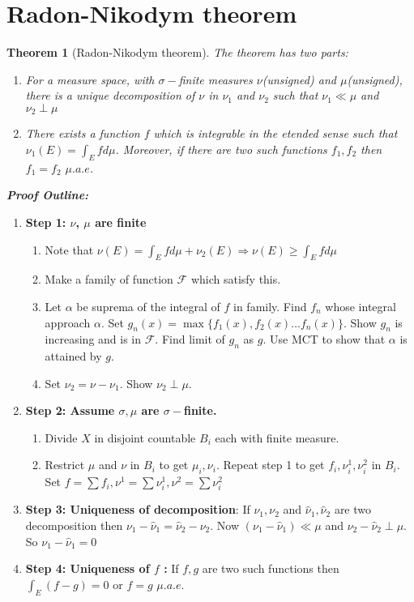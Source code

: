 \documentclass[notoc]{tufte-book}
\newtheorem{theorem}{Theorem}
\begin{document}
\section{Radon-Nikodym theorem}
\begin{theorem}[Radon-Nikodym theorem]
	The theorem has two parts:
	\begin{enumerate}
		\item For a measure space, with $\sigma-$finite measures $\nu$(unsigned) and $\mu$(unsigned), there is a unique decomposition of $\nu$ in $\nu_1$ and $\nu_2$ such that $\nu_1\ll\mu$ and $\nu_2\perp\mu$
		\item There exists a function $f$ which is integrable in the etended sense such that $\nu_1(E)=\int_Efd\mu$. Moreover, if there are two such functions $f_1,f_2$ then $f_1=f_2$ $\mu.a.e$. 
	\end{enumerate}
\end{theorem}
\textbf{\textit{Proof Outline:}}\\
\begin{enumerate}
	\item \textbf{Step 1: $\nu$, $\mu$ are finite}\\
		\begin{enumerate}
			\item Note that $\nu(E)=\int_Efd\mu+\nu_2(E)\Rightarrow \nu(E)\geq\int_Efd\mu$
			\item Make a family of function $\mathcal{F}$ which satisfy this. 
			\item Let $\alpha$ be suprema of the integral of $f$ in family. Find $f_n$ whose integral approach $\alpha$. Set $g_n(x)=\max\{f_1(x),f_2(x)\hdots f_n(x)\}$. Show $g_n$ is increasing and is in $\mathcal{ F}$. Find limit of $g_n$ as $g$. Use MCT to show that $\alpha$ is attained by $g$.
			\item  Set $\nu_2=\nu-\nu_1$. Show $\nu_2\perp\mu$. 
		\end{enumerate}
	\item  \textbf{Step 2: Assume $\sigma,\mu$ are $\sigma-$finite.}
	\begin{enumerate}
		\item Divide $X$ in disjoint countable $B_i$ each with finite measure.
		\item Restrict $\mu$ and $\nu$ in $B_i$ to get $\mu_i,\nu_i$. Repeat step 1 to get $f_i,\nu^1_i,\nu^2_i$ in $B_i$. Set $f=\sum f_i,\nu^1=\sum\nu^1_i,\nu^2=\sum\nu^2_i$
	\end{enumerate} 
	\item \textbf{Step 3: Uniqueness of decomposition}:
	If $\nu_1,\nu_2$ and $\hat\nu_1,\hat\nu_2$ are two decomposition then $\nu_1-\hat\nu_1=\hat\nu_2-\nu_2$. Now $(\nu_1-\hat\nu_1)\ll\mu$ and $\nu_2-\hat\nu_2\perp\mu$. So $\nu_1-\hat\nu_1=0$
	\item \textbf{Step 4: Uniqueness of $f$ :}
	If $f,g$ are two such functions then $\int_E(f-g)=0$ or $f=g$ $\mu.a.e$.  	
\end{enumerate}
\end{document}
